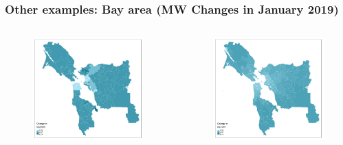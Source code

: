 \documentclass[aspectratio=169, t]{beamer}
\begin{document}
\begin{frame}[label = bay_example]
\frametitle{Other examples: Bay area (MW Changes in January 2019)}
    \begin{columns}
        \begin{column}{0.50\textwidth}
            \vspace{-4mm}
            \begin{figure}
                \centering
                \includegraphics[scale = 0.36]{maps_events/output/bay_area_2018-12_actual_mw.png}
            \end{figure}   
        \end{column}
        \begin{column}{0.50\textwidth}
            \vspace{-4mm}
            \begin{figure}
                \centering
                \includegraphics[scale = 0.36]{maps_events/output/bay_area2018-12_exp_mw.png}

\end{figure}
\end{column}
\end{columns}
\end{frame}
\end{document}
